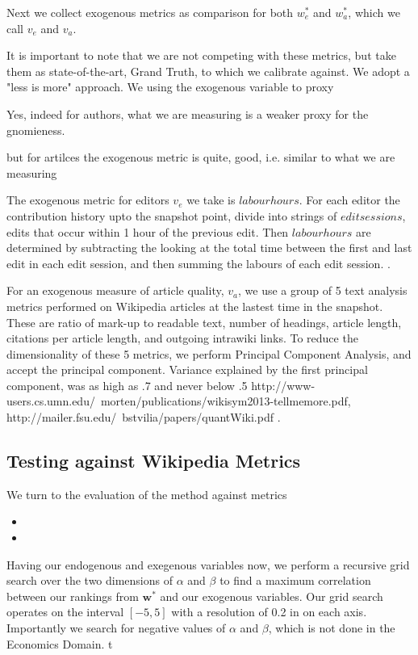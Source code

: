 \documentclass{acm_proc_article-sp}
\begin{document}
Next we collect exogenous metrics as comparison for both  $w^{*}_{e}$ and $w^{*}_{a}$, which we call  $v_e$ and $v_a$.

It is important to note that we are not competing with these metrics, but take them as state-of-the-art, Grand Truth, to which we calibrate against. We adopt a "less is more" approach. We using the exogenous variable to proxy 

Yes, indeed for authors, what we are measuring is a weaker proxy for the gnomieness.

but for artilces the exogenous metric is quite, good, i.e. similar to what we are measuring


The exogenous metric for editors $v_e$ we take is $labour hours$. For each editor the contribution history upto the snapshot point,  divide into strings of $edit sessions$, edits that occur within 1 hour of the previous edit. Then $labour hours$ are determined by subtracting the looking at the total time between the first and last edit in each edit session, and then summing the labours of each edit session. \cite{Geiger, Halfaker}. 

For an exogenous measure of article quality, $ v_a$,  we use a group of 5 text analysis metrics performed on Wikipedia articles at the lastest time in the snapshot. These are ratio of mark-up to readable text, number of headings, article length, citations per article length, and outgoing intrawiki links. To reduce the dimensionality of these 5 metrics, we perform Principal Component Analysis, and accept the principal component. Variance explained by the first principal component, was as high as .7 and never below .5 http://www-users.cs.umn.edu/~morten/publications/wikisym2013-tellmemore.pdf, http://mailer.fsu.edu/~bstvilia/papers/quantWiki.pdf \cite{ Morten}.


\subsection{Testing against Wikipedia Metrics}
We turn to the evaluation of the method against metrics 

\begin{itemize}
  \item 
  \item 
\end{itemize}


Having our endogenous and exegenous variables now, we perform a recursive grid search over the two dimensions of $\alpha$ and $\beta$ to find a maximum correlation between our rankings from $\mathbf{w^*}$ and our exogenous variables. Our grid search operates on the interval $[-5,5]$ with a resolution of 0.2 in on each axis. Importantly we search for negative values of $\alpha$ and $\beta$, which is not done in the Economics Domain. t
\end{document}
